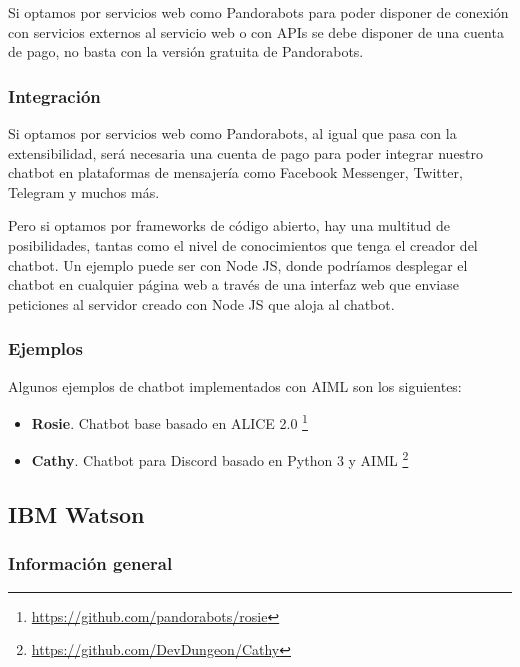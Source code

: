 Si optamos por servicios web como Pandorabots para poder disponer de conexión con servicios externos al servicio web o con \glspl{API} se debe disponer de una cuenta de pago, no basta con la versión gratuita de Pandorabots.

\subsubsection*{Integración}

Si optamos por servicios web como Pandorabots, al igual que pasa con la extensibilidad, será necesaria una cuenta de pago para poder integrar nuestro chatbot en plataformas de mensajería como Facebook Messenger, Twitter, Telegram y muchos más.

Pero si optamos por \glspl{framework} de código abierto, hay una multitud de posibilidades, tantas como el nivel de conocimientos que tenga el creador del chatbot. Un ejemplo puede ser con Node JS, donde podríamos desplegar el chatbot en cualquier página web a través de una interfaz web que enviase peticiones al servidor creado con Node JS que aloja al chatbot.

\subsubsection*{Ejemplos}

Algunos ejemplos de chatbot implementados con AIML son los siguientes:

\begin{itemize}
\item \textbf{Rosie}. Chatbot base basado en ALICE 2.0 \footnote{\url{https://github.com/pandorabots/rosie}}
\item \textbf{Cathy}. Chatbot para Discord basado en Python 3 y AIML \footnote{\url{https://github.com/DevDungeon/Cathy}}
\end{itemize}


\subsection{IBM Watson}

\subsubsection*{Información general}

